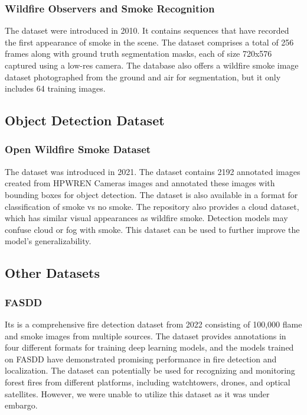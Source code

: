 \subsubsection{Wildfire Observers and Smoke Recognition \cite{wildfire_observer_smoke_recog}}
The dataset were introduced in 2010. It contains sequences that have recorded the first appearance of smoke in the scene. The dataset comprises a total of 256 frames along with ground truth segmentation masks, each of size 720x576 captured using a low-res camera. The database also offers a wildfire smoke image dataset photographed from the ground and air for segmentation, but it only includes 64 training images.

\subsection{Object Detection Dataset}

\subsubsection{Open Wildfire Smoke Dataset \cite{wildfire_aiformankind}}
The dataset was introduced in 2021. The dataset contains 2192 annotated images created from HPWREN Cameras images and annotated these images with bounding boxes for object detection. The dataset is also available in a format for classification of smoke vs no smoke. The repository also provides a cloud dataset, which has similar visual appearances as wildfire smoke. Detection models may confuse cloud or fog with smoke. This dataset can be used to further improve the model's generalizability.

\subsection{Other Datasets}
\subsubsection{FASDD \cite{wang_fasdd_2022}}
Its is a comprehensive fire detection dataset from 2022 consisting of 100,000 flame and smoke images from multiple sources. The dataset provides annotations in four different formats for training deep learning models, and the models trained on FASDD have demonstrated promising performance in fire detection and localization. The dataset can potentially be used for recognizing and monitoring forest fires from different platforms, including watchtowers, drones, and optical satellites. However, we were unable to utilize this dataset as it was under embargo.

